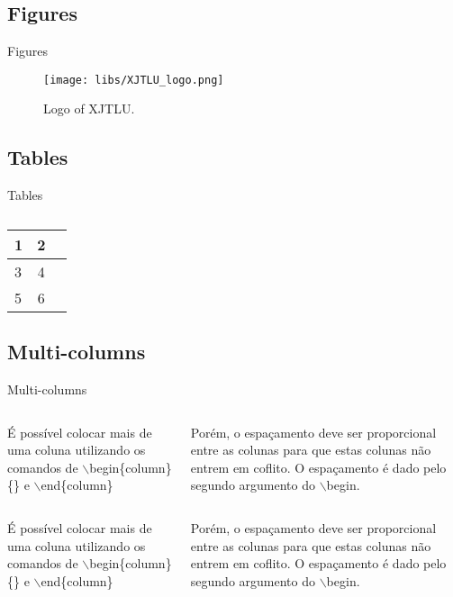 \documentclass{libs/XJTLU_format}
\begin{document}
\subsection{Figures}
\begin{frame}{Figures}
    \begin{figure}
        \centering
        \caption{Logo of XJTLU.}
        \texttt{[image: libs/XJTLU\_logo.png]}
        \label{fig:XJTLU_logo}
    \end{figure}
\end{frame}

\subsection{Tables}
\begin{frame}{Tables}
\begin{table}[hbt]
  \begin{tabular}{l|cc}
    1& 2& \\
    \hline
    3& 4& \\
    5& 6&
  \end{tabular}
  \caption{}
\end{table}

\end{frame}

\subsection{Multi-columns}
\begin{frame}{Multi-columns}
    \begin{columns}{}
        \begin{column}{0.5\textwidth}
            \justify
            É possível colocar mais de uma coluna utilizando os comandos de $\backslash$begin\{column\}\{\} e $\backslash$end\{column\}
        \end{column}
        \begin{column}{0.5\textwidth}
            \justify
            Porém, o espaçamento deve ser proporcional entre as colunas para que estas colunas não entrem em coflito. O espaçamento é dado pelo segundo argumento do $\backslash$begin.
        \end{column}
    \end{columns}   
    \begin{columns}{}
        \begin{column}{0.5\textwidth}
            \justify
            É possível colocar mais de uma coluna utilizando os comandos de $\backslash$begin\{column\}\{\} e $\backslash$end\{column\}
        \end{column}
        \begin{column}{0.5\textwidth}
            \justify
            Porém, o espaçamento deve ser proporcional entre as colunas para que estas colunas não entrem em coflito. O espaçamento é dado pelo segundo argumento do $\backslash$begin.
        \end{column}
    \end{columns}     
\end{frame}
\end{document}
